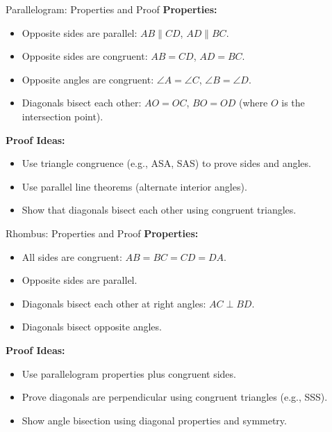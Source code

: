 \documentclass{beamer}
\begin{document}
\begin{frame}{Parallelogram: Properties and Proof}
\textbf{Properties:}
\begin{itemize}
    \item Opposite sides are parallel: $AB \parallel CD$, $AD \parallel BC$.
    \item Opposite sides are congruent: $AB = CD$, $AD = BC$.
    \item Opposite angles are congruent: $\angle A = \angle C$, $\angle B = \angle D$.
    \item Diagonals bisect each other: $AO = OC$, $BO = OD$ (where $O$ is the intersection point).
\end{itemize}

\vspace{1em}
\textbf{Proof Ideas:}
\begin{itemize}
    \item Use triangle congruence (e.g., ASA, SAS) to prove sides and angles.
    \item Use parallel line theorems (alternate interior angles).
    \item Show that diagonals bisect each other using congruent triangles.
\end{itemize}
\end{frame}

\begin{frame}{Rhombus: Properties and Proof}
\textbf{Properties:}
\begin{itemize}
    \item All sides are congruent: $AB = BC = CD = DA$.
    \item Opposite sides are parallel.
    \item Diagonals bisect each other at right angles: $AC \perp BD$.
    \item Diagonals bisect opposite angles.
\end{itemize}

\vspace{1em}
\textbf{Proof Ideas:}
\begin{itemize}
    \item Use parallelogram properties plus congruent sides.
    \item Prove diagonals are perpendicular using congruent triangles (e.g., SSS).
    \item Show angle bisection using diagonal properties and symmetry.
\end{itemize}
\end{frame}
\end{document}
